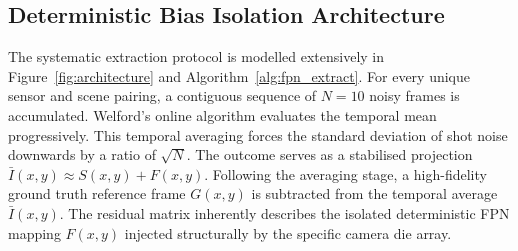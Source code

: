 \documentclass[conference]{IEEEtran}
\begin{document}
\subsection{Deterministic Bias Isolation Architecture}

The systematic extraction protocol is modelled extensively in Figure~\ref{fig:architecture} and Algorithm~\ref{alg:fpn_extract}. For every unique sensor and scene pairing, a contiguous sequence of $N=10$ noisy frames is accumulated. Welford's online algorithm \cite{konnik2014high} evaluates the temporal mean progressively. This temporal averaging forces the standard deviation of shot noise downwards by a ratio of $\sqrt{N}$. The outcome serves as a stabilised projection $\bar{I}(x,y) \approx S(x,y) + F(x,y)$. Following the averaging stage, a high-fidelity ground truth reference frame $G(x,y)$ is subtracted from the temporal average $\bar{I}(x,y)$. The residual matrix inherently describes the isolated deterministic FPN mapping $F(x,y)$ injected structurally by the specific camera die array. 
\end{document}
